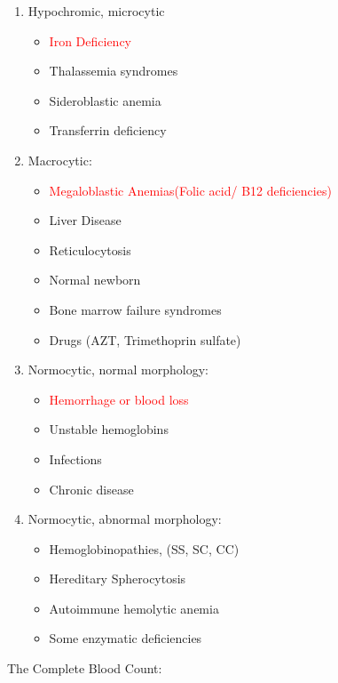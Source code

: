 \begin{enumerate}[1.]\tightlist
\item Hypochromic, microcytic
	\begin{itemize}\tightlist
	\item \textcolor{red}{Iron Deficiency}
	\item Thalassemia syndromes
	\item Sideroblastic anemia
	\item Transferrin deficiency
	\end{itemize}	
\item Macrocytic:
	\begin{itemize}\tightlist
	\item \textcolor{red}{Megaloblastic Anemias(Folic acid/ B12 deficiencies)}
	\item Liver Disease
	\item Reticulocytosis
	\item Normal newborn
	\item Bone marrow failure syndromes
	\item Drugs (AZT, Trimethoprin sulfate)
	\end{itemize}	
\item Normocytic, normal morphology:
	\begin{itemize}\tightlist
	\item \textcolor{red}{Hemorrhage or blood loss}
	\item Unstable hemoglobins
	\item Infections
	\item Chronic disease
	\end{itemize}
\item Normocytic, abnormal morphology:
	\begin{itemize}\tightlist
	\item Hemoglobinopathies, (SS, SC, CC)
	\item Hereditary Spherocytosis
	\item Autoimmune hemolytic anemia
	\item Some enzymatic deficiencies
	\end{itemize}
\end{enumerate}
\par
\medskip
{}
The Complete Blood Count:
